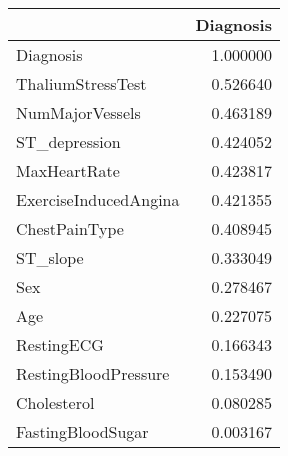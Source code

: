 \begin{tabular}{lr}
\toprule
{} &  Diagnosis \\
\midrule
Diagnosis             &   1.000000 \\
ThaliumStressTest     &   0.526640 \\
NumMajorVessels       &   0.463189 \\
ST\_depression         &   0.424052 \\
MaxHeartRate          &   0.423817 \\
ExerciseInducedAngina &   0.421355 \\
ChestPainType         &   0.408945 \\
ST\_slope              &   0.333049 \\
Sex                   &   0.278467 \\
Age                   &   0.227075 \\
RestingECG            &   0.166343 \\
RestingBloodPressure  &   0.153490 \\
Cholesterol           &   0.080285 \\
FastingBloodSugar     &   0.003167 \\
\bottomrule
\end{tabular}

